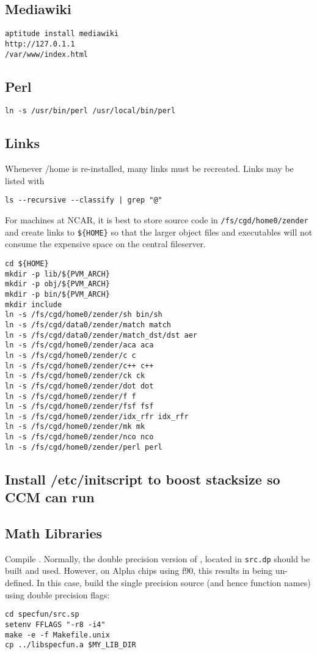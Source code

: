 \documentclass[12pt,twoside]{article}
\begin{document}
\subsection{Mediawiki}\label{sxn:mediawiki}
\begin{verbatim}
aptitude install mediawiki
http://127.0.1.1
/var/www/index.html
\end{verbatim}

\subsection{Perl}\label{sxn:perl}
\begin{verbatim}
ln -s /usr/bin/perl /usr/local/bin/perl
\end{verbatim}

\subsection{Links}\label{sxn:ln2}
Whenever /home is re-installed, many links must be recreated. 
Links may be listed with
\begin{verbatim}
ls --recursive --classify | grep "@"
\end{verbatim}
For machines at NCAR, it is best to store source code in
\verb'/fs/cgd/home0/zender' and create links to \verb'${HOME}'
so that the larger object files and executables will not 
consume the expensive space on the central fileserver.
\begin{verbatim}
cd ${HOME}
mkdir -p lib/${PVM_ARCH}
mkdir -p obj/${PVM_ARCH}
mkdir -p bin/${PVM_ARCH}
mkdir include
ln -s /fs/cgd/home0/zender/sh bin/sh
ln -s /fs/cgd/data0/zender/match match
ln -s /fs/cgd/data0/zender/match_dst/dst aer
ln -s /fs/cgd/home0/zender/aca aca
ln -s /fs/cgd/home0/zender/c c
ln -s /fs/cgd/home0/zender/c++ c++
ln -s /fs/cgd/home0/zender/ck ck
ln -s /fs/cgd/home0/zender/dot dot
ln -s /fs/cgd/home0/zender/f f
ln -s /fs/cgd/home0/zender/fsf fsf
ln -s /fs/cgd/home0/zender/idx_rfr idx_rfr
ln -s /fs/cgd/home0/zender/mk mk
ln -s /fs/cgd/home0/zender/nco nco
ln -s /fs/cgd/home0/zender/perl perl
\end{verbatim}

\subsection{Install /etc/initscript to boost stacksize so CCM can run}\label{sxn:etc}

\subsection{Math Libraries}\label{sxn:mth}
Compile .
Normally, the double precision version of ,
located in \verb'src.dp' should be built and used.
However, on Alpha chips using f90, this results in  
being un-defined.
In this case, build the single precision source (and hence function
names) using double precision flags:
\begin{verbatim}
cd specfun/src.sp
setenv FFLAGS "-r8 -i4"
make -e -f Makefile.unix
cp ../libspecfun.a $MY_LIB_DIR
\end{verbatim}
\end{document}
